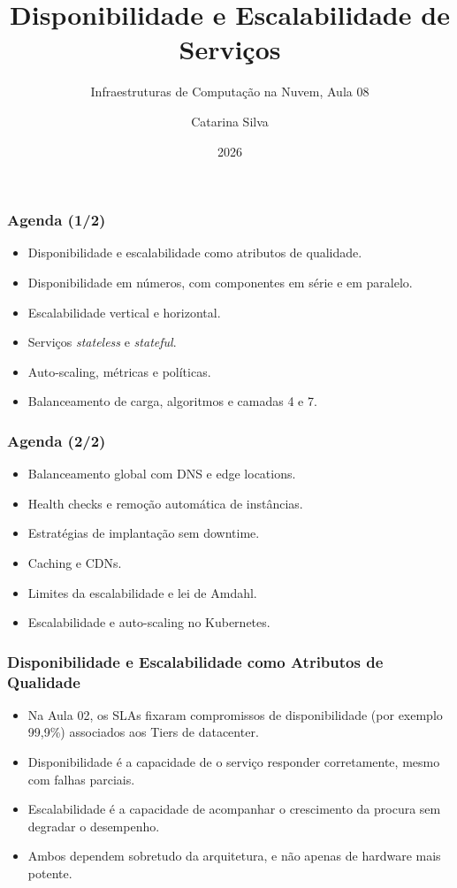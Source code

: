 \documentclass[aspectratio=169]{beamer}
\title{Disponibilidade e Escalabilidade de Serviços}
\subtitle{Infraestruturas de Computação na Nuvem, Aula 08}
\author{Catarina Silva}
\institute{ESTGA, Universidade de Aveiro}
\date{2026}
\begin{document}
\begin{frame}[plain]
  \titlepage
\end{frame}

\begin{frame}
\frametitle{Agenda \textcolor{NudeTaupe}{\small(1/2)}}
\begin{itemize}
    \setlength\itemsep{0.4cm}
    \item Disponibilidade e escalabilidade como atributos de qualidade.
    \item Disponibilidade em números, com componentes em série e em paralelo.
    \item Escalabilidade vertical e horizontal.
    \item Serviços \textit{stateless} e \textit{stateful}.
    \item Auto-scaling, métricas e políticas.
    \item Balanceamento de carga, algoritmos e camadas 4 e 7.
\end{itemize}
\end{frame}

\begin{frame}
\frametitle{Agenda \textcolor{NudeTaupe}{\small(2/2)}}
\begin{itemize}
    \setlength\itemsep{0.4cm}
    \item Balanceamento global com DNS e edge locations.
    \item Health checks e remoção automática de instâncias.
    \item Estratégias de implantação sem downtime.
    \item Caching e CDNs.
    \item Limites da escalabilidade e lei de Amdahl.
    \item Escalabilidade e auto-scaling no Kubernetes.
\end{itemize}
\end{frame}

\begin{frame}
\frametitle{Disponibilidade e Escalabilidade como Atributos de Qualidade}
\begin{itemize}
    \setlength\itemsep{0.4cm}
    \item Na Aula 02, os SLAs fixaram compromissos de disponibilidade (por exemplo 99,9\%) associados aos Tiers de datacenter.
    \item Disponibilidade é a capacidade de o serviço responder corretamente, mesmo com falhas parciais.
    \item Escalabilidade é a capacidade de acompanhar o crescimento da procura sem degradar o desempenho.
    \item Ambos dependem sobretudo da arquitetura, e não apenas de hardware mais potente.
\end{itemize}
\end{frame}
\end{document}
